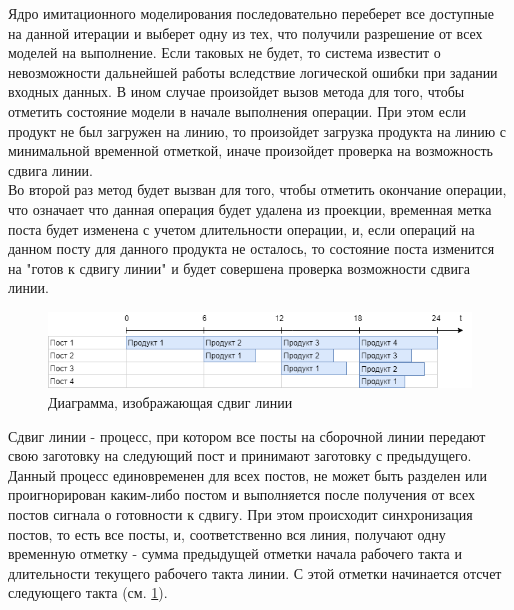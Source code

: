 \indent Ядро имитационного моделирования последовательно переберет все доступные на данной итерации и выберет одну из тех, что получили разрешение от всех моделей на выполнение.
Если таковых не будет, то система известит о невозможности дальнейшей работы вследствие логической ошибки при задании входных данных.
В ином случае произойдет вызов метода для того, чтобы отметить состояние модели в начале выполнения операции.
При этом если продукт не был загружен на линию, то произойдет загрузка продукта на линию с минимальной временной отметкой, иначе произойдет проверка на возможность сдвига линии.\\
\indent Во второй раз метод будет вызван для того, чтобы отметить окончание операции, что означает что данная операция будет удалена из проекции, временная метка поста будет изменена с учетом длительности операции, и, если операций на данном посту для данного продукта не осталось, то состояние поста изменится на "готов к сдвигу линии" и будет совершена проверка возможности сдвига линии.

\begin{figure}[ht]
	\centering
	\includegraphics[width=\linewidth]{pics/assemblyDiagram.png}
	\caption{Диаграмма, изображающая сдвиг линии}
	\label{fig:lineDiagram}
\end{figure}

\indent Сдвиг линии - процесс, при котором все посты на сборочной линии передают свою заготовку на следующий пост и принимают заготовку с предыдущего.
Данный процесс единовременен для всех постов, не может быть разделен или проигнорирован каким-либо постом и выполняется после получения от всех постов сигнала о готовности к сдвигу.
При этом происходит синхронизация постов, то есть все посты, и, соответственно вся линия, получают одну временную отметку - сумма предыдущей отметки начала рабочего такта и длительности текущего рабочего такта линии.
С этой отметки начинается отсчет следующего такта (см. \ref{fig:lineDiagram}).


